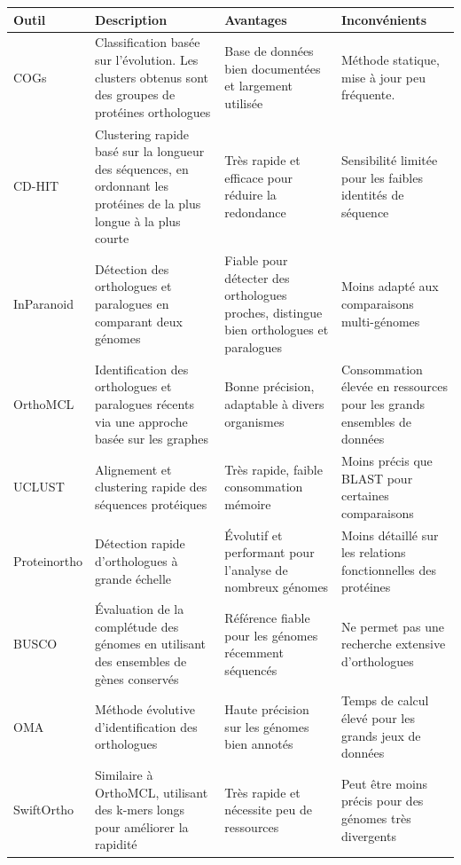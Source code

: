 \begin{table}[htbp]
    \footnotesize
    \centering
    \begin{tabular}{|p{}|p{}|p{}|p{}|}
\hline
\textbf{Outil} & \textbf{Description} & \textbf{Avantages} & \textbf{Inconvénients} \\
\hline
COGs \cite{tatusov_genomic_1997} & Classification basée sur l'évolution. Les clusters obtenus sont des groupes de protéines orthologues & Base de données bien documentées et largement utilisée & Méthode statique, mise à jour peu fréquente. \\
\hline
CD-HIT \cite{li_clustering_2001} & Clustering rapide basé sur la longueur des séquences, en ordonnant les protéines de la plus longue à la plus courte & Très rapide et efficace pour réduire la redondance & Sensibilité limitée pour les faibles identités de séquence \\
\hline
InParanoid \cite{remm_automatic_2001} & Détection des orthologues et paralogues en comparant deux génomes & Fiable pour détecter des orthologues proches, distingue bien orthologues et paralogues & Moins adapté aux comparaisons multi-génomes \\
\hline
OrthoMCL \cite{li_orthomcl_2003} & Identification des orthologues et paralogues récents via une approche basée sur les graphes & Bonne précision, adaptable à divers organismes & Consommation élevée en ressources pour les grands ensembles de données \\
\hline
UCLUST \cite{edgar_search_2010} & Alignement et clustering rapide des séquences protéiques & Très rapide, faible consommation mémoire & Moins précis que BLAST pour certaines comparaisons \\
\hline
Proteinortho \cite{lechner_proteinortho_2011} & Détection rapide d'orthologues à grande échelle & Évolutif et performant pour l'analyse de nombreux génomes & Moins détaillé sur les relations fonctionnelles des protéines \\
\hline
BUSCO \cite{simao_busco_2015} & Évaluation de la complétude des génomes en utilisant des ensembles de gènes conservés & Référence fiable pour les génomes récemment séquencés & Ne permet pas une recherche extensive d'orthologues \\
\hline
OMA \cite{altenhoff_oma_2019} & Méthode évolutive d'identification des orthologues & Haute précision sur les génomes bien annotés & Temps de calcul élevé pour les grands jeux de données \\
\hline
SwiftOrtho \cite{hu_swiftortho_2019} & Similaire à OrthoMCL, utilisant des k-mers longs pour améliorer la rapidité & Très rapide et nécessite peu de ressources & Peut être moins précis pour des génomes très divergents \\

\end{tabular}
\end{table}
